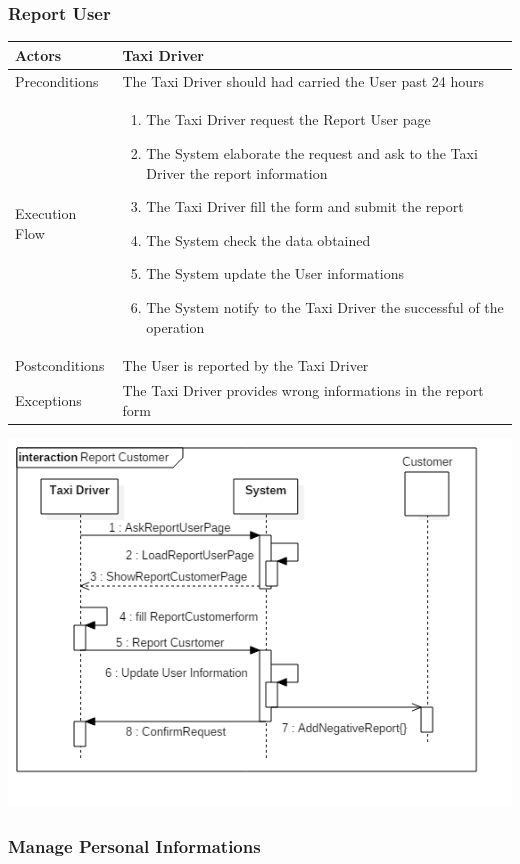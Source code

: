 \documentclass[english]{article}
\begin{document}
\subsubsection{Report User}

\begin{tabular}{lp{8cm}}
\hline
Actors & Taxi Driver \\
\hline
Preconditions & The Taxi Driver should had carried the User past 24 hours \\
\hline
Execution Flow &  
		\begin{enumerate}
			\item The Taxi Driver request the Report User page
			\item The System elaborate the request and ask to the Taxi Driver the report information
			\item The Taxi Driver fill the form and submit the report
			\item The System check the data obtained
			\item The System update the User informations
			\item The System notify to the Taxi Driver the successful of the operation
		\end{enumerate} 
	\\ 
\hline
Postconditions & The User is reported by the Taxi Driver \\
\hline
Exceptions & The Taxi Driver provides wrong informations in the report form
\end{tabular}

\includegraphics[width=\textwidth]{ReportUser}

\subsubsection{Manage Personal Informations}
\end{document}
